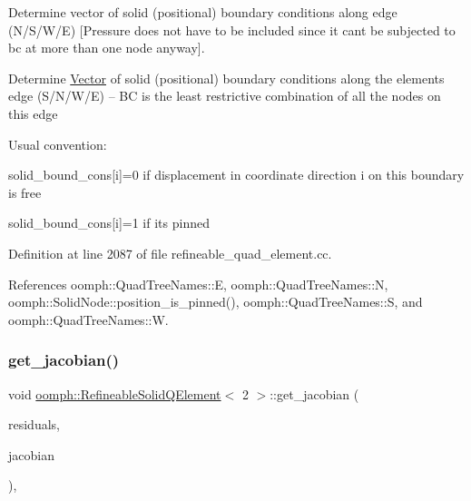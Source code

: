 Determine vector of solid (positional) boundary conditions along edge (N/\+S/\+W/E) \mbox{[}Pressure does not have to be included since it can\textquotesingle{}t be subjected to bc at more than one node anyway\mbox{]}. 

Determine \hyperlink{classoomph_1_1Vector}{Vector} of solid (positional) boundary conditions along the element\textquotesingle{}s edge (S/\+N/\+W/E) -- BC is the least restrictive combination of all the nodes on this edge

Usual convention\+:
\begin{DoxyItemize}
\item solid\+\_\+bound\+\_\+cons\mbox{[}i\mbox{]}=0 if displacement in coordinate direction i on this boundary is free
\item solid\+\_\+bound\+\_\+cons\mbox{[}i\mbox{]}=1 if it\textquotesingle{}s pinned 
\end{DoxyItemize}

Definition at line 2087 of file refineable\+\_\+quad\+\_\+element.\+cc.



References oomph\+::\+Quad\+Tree\+Names\+::E, oomph\+::\+Quad\+Tree\+Names\+::N, oomph\+::\+Solid\+Node\+::position\+\_\+is\+\_\+pinned(), oomph\+::\+Quad\+Tree\+Names\+::S, and oomph\+::\+Quad\+Tree\+Names\+::W.

\mbox{\label{classoomph_1_1RefineableSolidQElement_3_012_01_4_a9f9e21efe69a7bc8f47a227630ae94a9}} 
\subsubsection{\texorpdfstring{get\+\_\+jacobian()}{get\_jacobian()}}
{\footnotesize\ttfamily void \hyperlink{classoomph_1_1RefineableSolidQElement}{oomph\+::\+Refineable\+Solid\+Q\+Element}$<$ 2 $>$\+::get\+\_\+jacobian (\begin{DoxyParamCaption}\item[{\hyperlink{classoomph_1_1Vector}{Vector}$<$ double $>$ \&}]{residuals,  }\item[{\hyperlink{classoomph_1_1DenseMatrix}{Dense\+Matrix}$<$ double $>$ \&}]{jacobian }\end{DoxyParamCaption})\hspace{0.3cm}{\ttfamily [inline]}, {\ttfamily [virtual]}}



